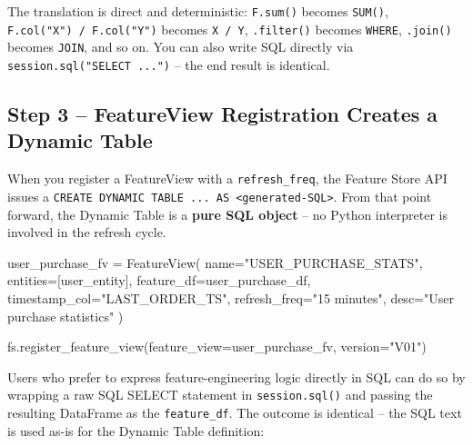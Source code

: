 \documentclass[
  letterpaper,
  DIV=11,
  numbers=noendperiod]{scrreprt}
\newenvironment{Shaded}{\begin{snugshade}}{\end{snugshade}}
\newcommand{\NormalTok}[1]{\textcolor[rgb]{0.00,0.23,0.31}{#1}}
\newcommand{\OperatorTok}[1]{\textcolor[rgb]{0.37,0.37,0.37}{#1}}
\newcommand{\StringTok}[1]{\textcolor[rgb]{0.13,0.47,0.30}{#1}}
\begin{document}
The translation is direct and deterministic: \texttt{F.sum()} becomes
\texttt{SUM()}, \texttt{F.col("X")\ /\ F.col("Y")} becomes
\texttt{X\ /\ Y}, \texttt{.filter()} becomes \texttt{WHERE},
\texttt{.join()} becomes \texttt{JOIN}, and so on. You can also write
SQL directly via \texttt{session.sql("SELECT\ ...")} -- the end result
is identical.

\hypertarget{step-3-featureview-registration-creates-a-dynamic-table}{%
\subsection{Step 3 -- FeatureView Registration Creates a Dynamic
Table}\label{step-3-featureview-registration-creates-a-dynamic-table}}

When you register a FeatureView with a \texttt{refresh\_freq}, the
Feature Store API issues a
\texttt{CREATE\ DYNAMIC\ TABLE\ ...\ AS\ \textless{}generated-SQL\textgreater{}}.
From that point forward, the Dynamic Table is a \textbf{pure SQL object}
-- no Python interpreter is involved in the refresh cycle.

\begin{Shaded}
\begin{Highlighting}[]
\NormalTok{user\_purchase\_fv }\OperatorTok{=}\NormalTok{ FeatureView(}
\NormalTok{    name}\OperatorTok{=}\StringTok{"USER\_PURCHASE\_STATS"}\NormalTok{,}
\NormalTok{    entities}\OperatorTok{=}\NormalTok{[user\_entity],}
\NormalTok{    feature\_df}\OperatorTok{=}\NormalTok{user\_purchase\_df,}
\NormalTok{    timestamp\_col}\OperatorTok{=}\StringTok{"LAST\_ORDER\_TS"}\NormalTok{,}
\NormalTok{    refresh\_freq}\OperatorTok{=}\StringTok{"15 minutes"}\NormalTok{,}
\NormalTok{    desc}\OperatorTok{=}\StringTok{"User purchase statistics"}
\NormalTok{)}

\NormalTok{fs.register\_feature\_view(feature\_view}\OperatorTok{=}\NormalTok{user\_purchase\_fv, version}\OperatorTok{=}\StringTok{"V01"}\NormalTok{)}
\end{Highlighting}
\end{Shaded}

Users who prefer to express feature-engineering logic directly in SQL
can do so by wrapping a raw SQL SELECT statement in
\texttt{session.sql()} and passing the resulting DataFrame as the
\texttt{feature\_df}. The outcome is identical -- the SQL text is used
as-is for the Dynamic Table definition:
\end{document}
